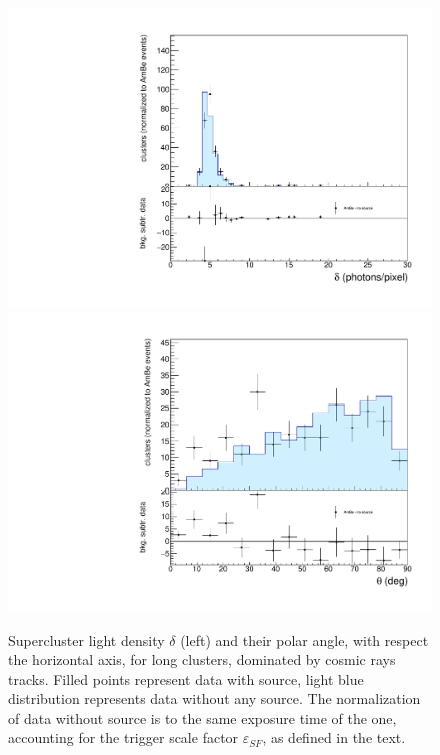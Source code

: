 \begin{figure}[ht]
  \begin{center}
  \includegraphics[width=0.45\linewidth]{figures/density_cosmics}
  \includegraphics[width=0.45\linewidth]{figures/inclination_cosmics}

  \caption{Supercluster light density $\delta$ (left) and their polar
    angle, with respect the horizontal axis, for long clusters,
    dominated by cosmic rays tracks.  Filled points represent data
    with \ambe source, light blue distribution represents data without
    any source.  The normalization of data without source is to the
    same exposure time of the \ambe one, accounting for the trigger
    scale factor $\varepsilon_{SF}$, as defined in the
    text.  \label{fig:cosmics}}

\end{center}
\end{figure}
